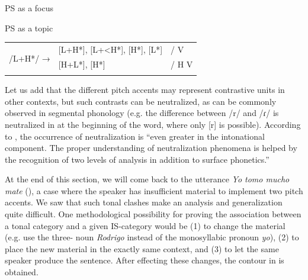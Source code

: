 \documentclass[output=paper]{langsci/langscibook}
\begin{document}
\ea\label{ex:pes:10}
{PS as a focus}\\
\z



\ea\label{ex:pes:11}
{PS as a topic}\\
\begin{tabular}{lll}
\multirow{3}{*}{/L+H*/  →}  & [L+H*], [L+<H*], [H*], [L*]                   &/  {\longrule} V \\{}
				&  [H+L*], [H*]    &/ H\textminus{}{\longrule} V\\{}
             
\end{tabular}
\z




%
     
Let us add that the different pitch accents may represent contrastive units in other contexts, but such contrasts can be neutralized, as can be commonly observed in segmental phonology (e.g. the difference between /r/ and /ɾ/ is neutralized in  at the beginning of the word, where only [r] is possible). According to  \citet[13]{Hualde2016}, the occurrence of neutralization is ``even greater in the intonational component. The proper understanding of neutralization phenomena is helped by the recognition of two levels of analysis in addition to surface phonetics.''

At the end of this section, we will come back to the utterance \textit{Yo tomo mucho mate} (), a case where the speaker has insufficient  material to implement two pitch accents. We saw that such tonal clashes make an analysis and generalization quite difficult. One methodological possibility for proving the association between a tonal category and a given IS-category would be
(1) to change the material (e.g. use the three-  noun \textit{Rodrigo} instead of the monosyllabic pronoun \textit{yo}),
(2) to place the new material in the exactly same context, and
(3) to let the same speaker produce the sentence. After effecting these changes, the contour in  is obtained.
\end{document}
